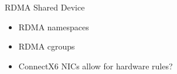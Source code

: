 \documentclass{beamer}
\begin{document}
\begin{frame}{RDMA Shared Device}
    \begin{itemize}
        \item RDMA namespaces
        \item RDMA cgroups
        \item ConnectX6 NICs allow for hardware rules?
    \end{itemize}
\end{frame}

\end{document}
